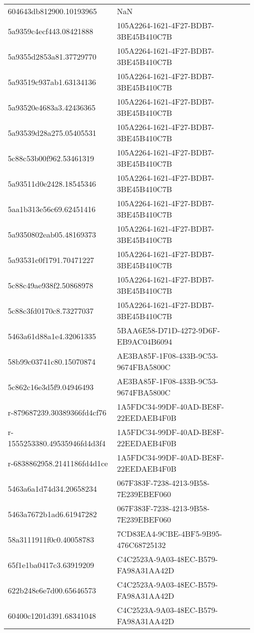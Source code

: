 \begin{tabular}{ll}
604643db812900.10193965 & NaN \\
5a9359c4ecf443.08421888 & 105A2264-1621-4F27-BDB7-3BE45B410C7B \\
5a9355d2853a81.37729770 & 105A2264-1621-4F27-BDB7-3BE45B410C7B \\
5a93519c937ab1.63134136 & 105A2264-1621-4F27-BDB7-3BE45B410C7B \\
5a93520e4683a3.42436365 & 105A2264-1621-4F27-BDB7-3BE45B410C7B \\
5a93539d28a275.05405531 & 105A2264-1621-4F27-BDB7-3BE45B410C7B \\
5c88c53b00f962.53461319 & 105A2264-1621-4F27-BDB7-3BE45B410C7B \\
5a93511d0e2428.18545346 & 105A2264-1621-4F27-BDB7-3BE45B410C7B \\
5aa1b313e56c69.62451416 & 105A2264-1621-4F27-BDB7-3BE45B410C7B \\
5a9350802eab05.48169373 & 105A2264-1621-4F27-BDB7-3BE45B410C7B \\
5a93531c0f1791.70471227 & 105A2264-1621-4F27-BDB7-3BE45B410C7B \\
5c88c49ae938f2.50868978 & 105A2264-1621-4F27-BDB7-3BE45B410C7B \\
5c88c3fd0170c8.73277037 & 105A2264-1621-4F27-BDB7-3BE45B410C7B \\
5463a61d88a1e4.32061335 & 5BAA6E58-D71D-4272-9D6F-EB9AC04B6094 \\
58b99c03741c80.15070874 & AE3BA85F-1F08-433B-9C53-9674FBA5800C \\
5c862c16e3d5f9.04946493 & AE3BA85F-1F08-433B-9C53-9674FBA5800C \\
r-879687239.30389366fd4cf76 & 1A5FDC34-99DF-40AD-BE8F-22EEDAEB4F0B \\
r-1555253380.49535946fd4d3f4 & 1A5FDC34-99DF-40AD-BE8F-22EEDAEB4F0B \\
r-6838862958.2141186fd4d1ce & 1A5FDC34-99DF-40AD-BE8F-22EEDAEB4F0B \\
5463a6a1d74d34.20658234 & 067F383F-7238-4213-9B58-7E239EBEF060 \\
5463a7672b1ad6.61947282 & 067F383F-7238-4213-9B58-7E239EBEF060 \\
58a3111911f0c0.40058783 & 7CD83EA4-9CBE-4BF5-9B95-476C68725132 \\
65f1e1ba0417c3.63919209 & C4C2523A-9A03-48EC-B579-FA98A31AA42D \\
622b248e6e7d00.65646573 & C4C2523A-9A03-48EC-B579-FA98A31AA42D \\
60400c1201d391.68341048 & C4C2523A-9A03-48EC-B579-FA98A31AA42D \\

\end{tabular}
